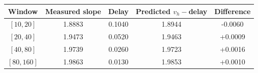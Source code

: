 \begin{tabular}{ccccc}
\toprule
Window & Measured slope & Delay & Predicted $v_h-{}$delay & Difference \\
\midrule
$[10,20]$ & 1.8883 & 0.1040 & 1.8944 & -0.0060 \\
$[20,40]$ & 1.9473 & 0.0520 & 1.9463 & +0.0009 \\
$[40,80]$ & 1.9739 & 0.0260 & 1.9723 & +0.0016 \\
$[80,160]$ & 1.9863 & 0.0130 & 1.9853 & +0.0010 \\
\bottomrule
\end{tabular}
